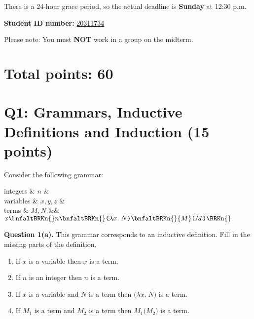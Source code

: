 
\gdef\lecturenumber{Midterm}
\gdef\subsectioncounters{1}

\usepackage{etoolbox}

\newcommand{\blanks}[1]{\ensuremath{\dashuline{\hspace{#1}}}}



\date{Friday, 2022--03--04, 12:30 p.m. to Saturday, 2022--03--05, 12:30 p.m.}



There is a 24-hour grace period, so the actual deadline is \textbf{Sunday} at 12:30 p.m.

\bigskip

\textbf{Student ID number:}  \uline{20311734}

\medskip

Please note: You must \textbf{NOT} work in a group on the midterm.


\section*{Total points: 60}

\section{Q1: Grammars, Inductive Definitions and Induction (15 points)}

Consider the following grammar:

\newcommand{\lcabs}[2]{\texttt(\lambda{#1}.\;{#2}\texttt)}
\newcommand{\lcapp}[2]{{#1}\texttt(#2\texttt)}

\begin{grammar}
integers & $n$ &
\\
variables & $x, y, z$ &
\\
terms  & $M, N$ &\bnfas&
      $x
      \bnfaltBRKn{}
      n
      \bnfaltBRKn{}
      \lcabs{x}{N}
      \bnfaltBRKn{}
      \lcapp{M}{M}
      \BRKn{}
      $
\end{grammar}

\textbf{Question 1(a).} This grammar corresponds to an inductive definition.  Fill in the missing parts of the definition.

\begin{enumerate}
\item If $x$ is a variable then $x$ is a term.

\item If $n$ is an integer then $n$ is a term.

\item If $x$ is a variable and $N$ is a term then $\lcabs{x}{N}$ is a term.

\item If $M_1$ is a term and $M_2$ is a term then $\lcapp{M_1}{M_2}$ is a term.

\end{enumerate}

